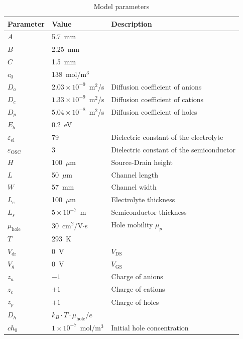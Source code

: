 \begin{table}[htbp]
    \centering
    \caption{Model parameters}
    \begin{tabular}{lll}
    \toprule
    \textbf{Parameter} & \textbf{Value} & \textbf{Description} \\
    \midrule
    $A$ & 5.7~mm &  \\
    $B$ & 2.25~mm &  \\
    $C$ & 1.5~mm &  \\
    $c_0$ & 138~mol/m$^3$ &  \\
    $D_a$ & $2.03 \times 10^{-9}$~m$^2$/s & Diffusion coefficient of anions \\
    $D_c$ & $1.33 \times 10^{-9}$~m$^2$/s & Diffusion coefficient of cations \\
    $D_p$ & $5.04 \times 10^{-8}$~m$^2$/s & Diffusion coefficient of holes \\
    $E_b$ & 0.2~eV &  \\
    $\varepsilon_{\text{el}}$ & 79 & Dielectric constant of the electrolyte \\
    $\varepsilon_{\text{OSC}}$ & 3 & Dielectric constant of the semiconductor \\
    $H$ & 100~$\mu$m & Source-Drain height \\
    $L$ & 50~$\mu$m & Channel length \\
    $W$ & 57~mm &  Channel width \\
    $L_e$ & 100~$\mu$m & Electrolyte thickness \\
    $L_s$ & $5 \times 10^{-7}$~m & Semiconductor thickness \\
    $\mu_{\text{hole}}$ & 30~cm$^2$/V$\cdot$s & Hole mobility $\mu_p$ \\
    $T$ & 293~K &  \\
    $V_{\text{dr}}$ & 0~V & $V_{\text{DS}}$ \\
    $V_g$ & 0~V & $V_{\text{GS}}$ \\
    $z_a$ & $-1$ & Charge of anions \\
    $z_c$ & $+1$ & Charge of cations \\
    $z_p$ & $+1$ & Charge of holes \\
    $D_h$ & $k_B \cdot T \cdot \mu_{\text{hole}} / e$ &  \\
    $ch_0$ & $1 \times 10^{-7}$~mol/m$^3$ & Initial hole concentration \\
    \bottomrule
    \end{tabular}
    \label{tab:model_parameters}
\end{table}


    